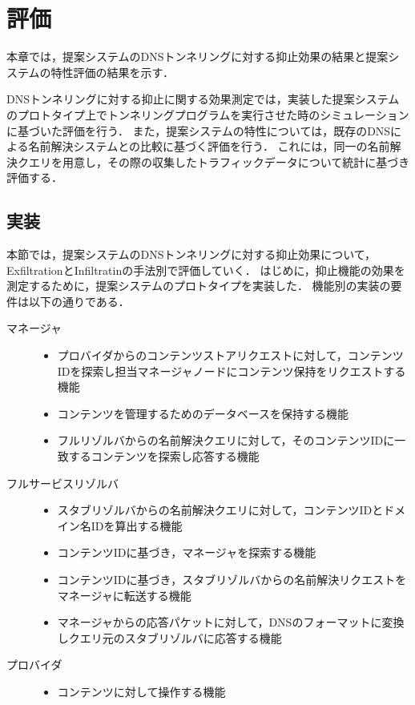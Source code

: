 \section{評価}
本章では，提案システムのDNSトンネリングに対する抑止効果の結果と提案システムの特性評価の結果を示す．

DNSトンネリングに対する抑止に関する効果測定では，実装した提案システムのプロトタイプ上でトンネリングプログラムを実行させた時のシミュレーションに基づいた評価を行う．
また，提案システムの特性については，既存のDNSによる名前解決システムとの比較に基づく評価を行う．
これには，同一の名前解決クエリを用意し，その際の収集したトラフィックデータについて統計に基づき評価する．

\subsection{実装}
本節では，提案システムのDNSトンネリングに対する抑止効果について，ExfiltrationとInfiltratinの手法別で評価していく．
はじめに，抑止機能の効果を測定するために，提案システムのプロトタイプを実装した．
機能別の実装の要件は以下の通りである．

\begin{description}
 \item[マネージャ]\mbox{}
  \begin{itemize}
   \item プロバイダからのコンテンツストアリクエストに対して，コンテンツIDを探索し担当マネージャノードにコンテンツ保持をリクエストする機能
   \item コンテンツを管理するためのデータベースを保持する機能
   \item フルリゾルバからの名前解決クエリに対して，そのコンテンツIDに一致するコンテンツを探索し応答する機能
  \end{itemize}
 \item[フルサービスリゾルバ]\mbox{}
  \begin{itemize}
   \item スタブリゾルバからの名前解決クエリに対して，コンテンツIDとドメイン名IDを算出する機能
   \item コンテンツIDに基づき，マネージャを探索する機能
   \item コンテンツIDに基づき，スタブリゾルバからの名前解決リクエストをマネージャに転送する機能
   \item マネージャからの応答パケットに対して，DNSのフォーマットに変換しクエリ元のスタブリゾルバに応答する機能
  \end{itemize}
 \item [プロバイダ]\mbox{}
  \begin{itemize}
   \item コンテンツに対して操作する機能
  \end{itemize}
\end{description}

